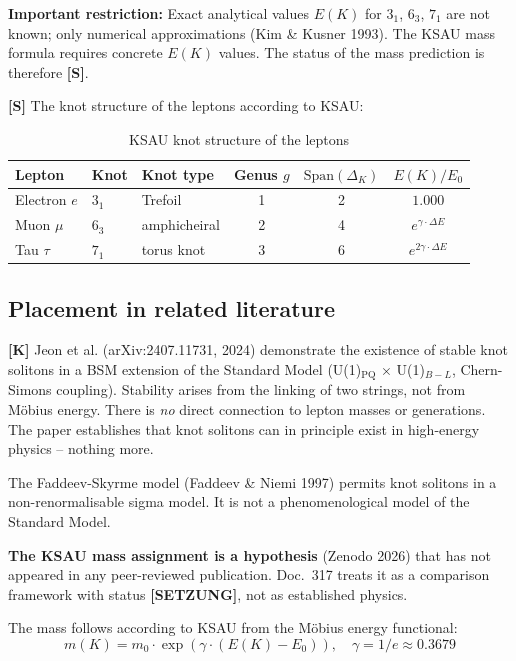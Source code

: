 \textbf{Important restriction:} Exact analytical values $E(K)$ for
$3_1$, $6_3$, $7_1$ are not known; only numerical approximations
(Kim \& Kusner 1993). The KSAU mass formula requires concrete $E(K)$
values. The status of the mass prediction is therefore \textbf{[S]}.

\textbf{[S]} The knot structure of the leptons according to KSAU:

\begin{table}[h]
\centering
\caption{KSAU knot structure of the leptons}
\label{tab:ksau_knots_en}
\begin{tabular}{lllccc}
\toprule
Lepton & Knot & Knot type & Genus $g$ &
  $\text{Span}(\Delta_K)$ & $E(K)/E_0$ \\
\midrule
Electron $e$  & $3_1$ & Trefoil   & 1 & 2 & $1.000$ \\
Muon $\mu$    & $6_3$ & amphicheiral & 2 & 4 & $e^{\gamma\cdot\Delta E}$ \\
Tau $\tau$    & $7_1$ & torus knot & 3 & 6 & $e^{2\gamma\cdot\Delta E}$ \\
\bottomrule
\end{tabular}
\end{table}

\subsection{Placement in related literature}

\textbf{[K]} Jeon et al. (arXiv:2407.11731, 2024) demonstrate the
existence of stable knot solitons in a BSM extension of the Standard
Model (U(1)$_\text{PQ}$ $\times$ U(1)$_{B-L}$, Chern-Simons coupling).
Stability arises from the linking of two strings, not from Möbius
energy. There is \emph{no} direct connection to lepton masses or
generations. The paper establishes that knot solitons can in principle
exist in high-energy physics -- nothing more.

The Faddeev-Skyrme model (Faddeev \& Niemi 1997) permits knot solitons
in a non-renormalisable sigma model. It is not a phenomenological model
of the Standard Model.

\textbf{The KSAU mass assignment is a hypothesis} (Zenodo 2026) that
has not appeared in any peer-reviewed publication. Doc.~317 treats it
as a comparison framework with status \textbf{[SETZUNG]}, not as
established physics.

The mass follows according to KSAU from the Möbius energy functional:
\begin{equation}
  m(K) = m_0 \cdot \exp(\gamma \cdot (E(K) - E_0)),
  \quad \gamma = 1/e \approx 0.3679
\end{equation}

